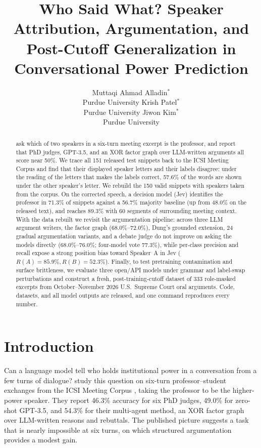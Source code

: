 \documentclass[11pt]{article}
\title{Who Said What? Speaker Attribution, Argumentation, and Post-Cutoff Generalization in Conversational Power Prediction}
\author{Muttaqi Ahmad Alladin$^{*}$ \\
  Purdue University \And
  Krish Patel$^{*}$ \\
  Purdue University \And
  Jiwon Kim$^{*}$ \\
  Purdue University}
\begin{document}
\maketitle
\begingroup\renewcommand{\thefootnote}{$*$}\endgroup

\begin{abstract}
\citet{wu2025power} ask which of two speakers in a six-turn meeting excerpt is the professor, and report that PhD judges, GPT-3.5, and an XOR factor graph over LLM-written arguments all score near 50\%.
We trace all 151 released test snippets back to the ICSI Meeting Corpus and find that their displayed speaker letters and their labels disagree: under the reading of the letters that makes the labels correct, 57.6\% of the words are shown under the other speaker's letter.
We rebuild the 150 valid snippets with speakers taken from the corpus.
On the corrected speech, a decision model (Jev) identifies the professor in 71.3\% of snippets against a 56.7\% majority baseline (up from 48.0\% on the released text), and reaches 89.3\% with 60 segments of surrounding meeting context.
With the data rebuilt we revisit the argumentation pipeline: across three LLM argument writers, the factor graph (68.0\%--72.0\%), Dung's grounded extension, 24 gradual argumentation variants, and a debate judge do not improve on asking the models directly (68.0\%--76.0\%; four-model vote 77.3\%), while per-class precision and recall expose a strong position bias toward Speaker~A in Jev ($R(A)=85.9\%, R(B)=52.3\%$).
Finally, to test pretraining contamination and surface brittleness, we evaluate three open/API models under grammar and label-swap perturbations and construct a fresh, post-training-cutoff dataset of 333 role-masked excerpts from October--November 2026 U.S.\ Supreme Court oral arguments.
Code, datasets, and all model outputs are released, and one command reproduces every number.
\end{abstract}

\section{Introduction}

Can a language model tell who holds institutional power in a conversation from a few turns of dialogue?
\citet{wu2025power} study this question on six-turn professor--student exchanges from the ICSI Meeting Corpus \citep{janin2003icsi}, taking the professor to be the higher-power speaker.
They report 46.3\% accuracy for six PhD judges, 49.0\% for zero-shot GPT-3.5, and 54.3\% for their multi-agent method, an XOR factor graph over LLM-written reasons and rebuttals.
The published picture suggests a task that is nearly impossible at six turns, on which structured argumentation provides a modest gain.
\end{document}
